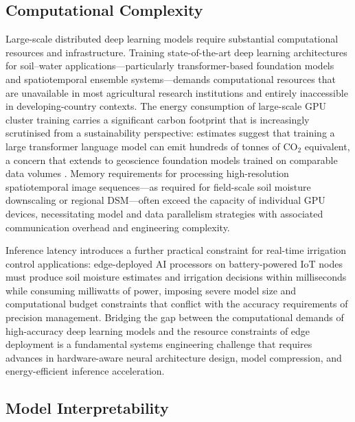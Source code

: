 \documentclass[land,article,submit,pdftex,moreauthors]{Definitions/mdpi}
\numberwithin{equation}{section}
\begin{document}
\subsection{Computational Complexity}

Large-scale distributed deep learning models require substantial computational resources and infrastructure. Training state-of-the-art deep learning architectures for soil--water applications---particularly transformer-based foundation models and spatiotemporal ensemble systems---demands computational resources that are unavailable in most agricultural research institutions and entirely inaccessible in developing-country contexts. The energy consumption of large-scale GPU cluster training carries a significant carbon footprint that is increasingly scrutinised from a sustainability perspective: estimates suggest that training a large transformer language model can emit hundreds of tonnes of CO$_2$ equivalent, a concern that extends to geoscience foundation models trained on comparable data volumes \citep{schwartz2020green}. Memory requirements for processing high-resolution spatiotemporal image sequences---as required for field-scale soil moisture downscaling or regional DSM---often exceed the capacity of individual GPU devices, necessitating model and data parallelism strategies with associated communication overhead and engineering complexity.

Inference latency introduces a further practical constraint for real-time irrigation control applications: edge-deployed AI processors on battery-powered IoT nodes must produce soil moisture estimates and irrigation decisions within milliseconds while consuming milliwatts of power, imposing severe model size and computational budget constraints that conflict with the accuracy requirements of precision management. Bridging the gap between the computational demands of high-accuracy deep learning models and the resource constraints of edge deployment is a fundamental systems engineering challenge that requires advances in hardware-aware neural architecture design, model compression, and energy-efficient inference acceleration.

\subsection{Model Interpretability}
\end{document}
